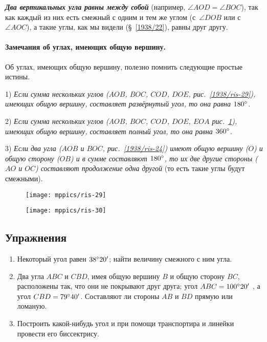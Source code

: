 \textbf{\emph{Два вертикальных угла равны между собой}} (например, $\angle AOD = \angle BOC$), так как каждый из них есть смежный с одним и тем же углом (с~$\angle DOB$ или с~$\angle AOC$), а такие углы, как мы видели (§~\ref{1938/22}), равны друг другу.

\paragraph{Замечания об углах, имеющих общую вершину.}\label{1938/27}
Об углах, имеющих общую вершину, полезно помнить следующие простые истины.

1) \emph{Если сумма нескольких углов ($AOB$, $BOC$, $COD$, $DOE$, рис.~\ref{1938/ris-29}), имеющих общую вершину, составляет развёрнутый угол, то она равна $180\degree$.}

2) \emph{Если сумма нескольких углов ($AOB$, $BOC$, $COD$, $DOE$, $EOA$ рис.~\ref{1938/ris-30}), имеющих общую вершину, составляет полный угол, то она равна  $360\degree$.}

3) \emph{Если два угла ($AOB$ и $BOC$, рис.~\ref{1938/ris-24}) имеют общую вершину ($O$) и общую сторону ($OB$) и в сумме составляют $180\degree$, то их две другие стороны ($AO$ и $OC$) составляют продолжение одна другой} (то есть такие углы будут смежными).

\begin{figure}[h]
\begin{minipage}{.48\textwidth}
\centering
\texttt{[image: mppics/ris-29]}
\end{minipage}\hfill
\begin{minipage}{.48\textwidth}
\centering
\texttt{[image: mppics/ris-30]}
\end{minipage}

\medskip

\begin{minipage}{.48\textwidth}
\centering
\caption{}\label{1938/ris-29}
\end{minipage}\hfill
\begin{minipage}{.48\textwidth}
\centering
\caption{}\label{1938/ris-30}
\end{minipage}
\vskip-4mm
\end{figure}


\subsection*{Упражнения}


\begin{enumerate}
\item
Некоторый угол равен $38\degree 20'$;
найти величину смежного с ним угла.

\item
Два угла $ABC$ и $CBD$, имея общую вершину $B$ и общую сторону $BC$, расположены так, что они не покрывают друг друга;
угол $ABC = 100\degree20'$ , а угол $CBD = 79\degree 40'$.
Составляют ли стороны $AB$ и $BD$ прямую или ломаную.

\item
Построить какой-нибудь угол и при помощи транспортира и линейки провести его биссектрису.

\end{enumerate}

